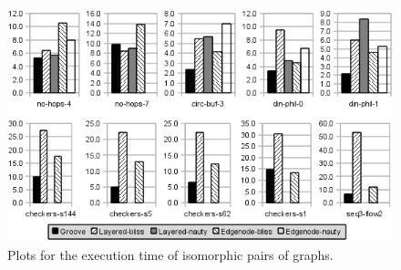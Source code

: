 \begin{figure}[!tbp]
\begin{center}
\includegraphics[scale=0.6]{images/plot.png}
\caption{Plots for the execution time of isomorphic pairs of graphs.}
\label{fig:plot}
\end{center}
\end{figure}
